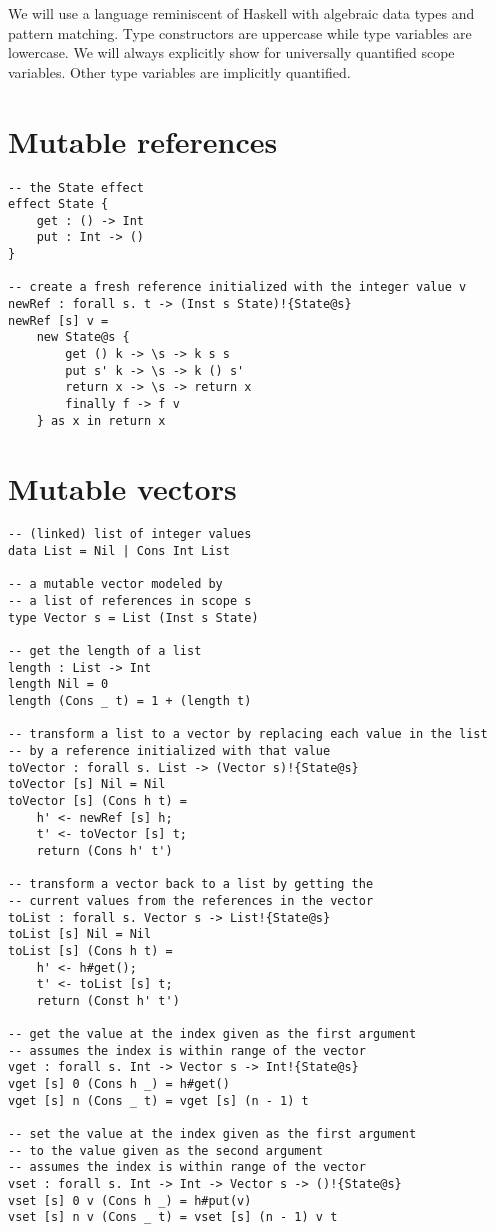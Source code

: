 \iffalse
\fi

We will use a language reminiscent of Haskell with algebraic data types and pattern matching.
Type constructors are uppercase while type variables are lowercase.
We will always explicitly show  for universally quantified scope variables.
Other type variables are implicitly quantified.

\section{Mutable references}
\begin{verbatim}
-- the State effect
effect State {
	get : () -> Int
	put : Int -> ()
}

-- create a fresh reference initialized with the integer value v
newRef : forall s. t -> (Inst s State)!{State@s}
newRef [s] v =
	new State@s {
		get () k -> \s -> k s s
		put s' k -> \s -> k () s'
		return x -> \s -> return x
		finally f -> f v
	} as x in return x
\end{verbatim}

\section{Mutable vectors}
\begin{verbatim}
-- (linked) list of integer values
data List = Nil | Cons Int List

-- a mutable vector modeled by
-- a list of references in scope s
type Vector s = List (Inst s State)

-- get the length of a list
length : List -> Int
length Nil = 0
length (Cons _ t) = 1 + (length t)

-- transform a list to a vector by replacing each value in the list
-- by a reference initialized with that value
toVector : forall s. List -> (Vector s)!{State@s}
toVector [s] Nil = Nil
toVector [s] (Cons h t) =
	h' <- newRef [s] h;
	t' <- toVector [s] t;
	return (Cons h' t')

-- transform a vector back to a list by getting the
-- current values from the references in the vector
toList : forall s. Vector s -> List!{State@s}
toList [s] Nil = Nil
toList [s] (Cons h t) =
	h' <- h#get();
	t' <- toList [s] t;
	return (Const h' t')

-- get the value at the index given as the first argument
-- assumes the index is within range of the vector
vget : forall s. Int -> Vector s -> Int!{State@s}
vget [s] 0 (Cons h _) = h#get()
vget [s] n (Cons _ t) = vget [s] (n - 1) t

-- set the value at the index given as the first argument
-- to the value given as the second argument
-- assumes the index is within range of the vector
vset : forall s. Int -> Int -> Vector s -> ()!{State@s}
vset [s] 0 v (Cons h _) = h#put(v)
vset [s] n v (Cons _ t) = vset [s] (n - 1) v t
\end{verbatim}

